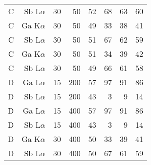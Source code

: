 \begin{table}[phtb]
\begin{center}
\begin{tabular}{rrrrrrrr}
            C               & Sb L$\alpha$  & 30             & 50             & 52                    & 68                     & 63                     & 60                     \\
            C               & Ga K$\alpha$  & 30             & 50             & 49                    & 33                     & 38                     & 41                     \\
            C               & Sb L$\alpha$  & 30             & 50             & 51                    & 67                     & 62                     & 59                     \\
            C               & Ga K$\alpha$  & 30             & 50             & 51                    & 34                     & 39                     & 42                     \\
            C               & Sb L$\alpha$  & 30             & 50             & 49                    & 66                     & 61                     & 58                     \\
            \hline
            D               & Ga L$\alpha$  & 15             & 200            & 57                    & 97                     & 91                     & 86                     \\
            D               & Sb L$\alpha$  & 15             & 200            & 43                    & 3                      & 9                      & 14                     \\
            D               & Ga L$\alpha$  & 15             & 400            & 57                    & 97                     & 91                     & 86                     \\
            D               & Sb L$\alpha$  & 15             & 400            & 43                    & 3                      & 9                      & 14                     \\
            D               & Ga K$\alpha$  & 30             & 400            & 50                    & 33                     & 39                     & 41                     \\
            D               & Sb L$\alpha$  & 30             & 400            & 50                    & 67                     & 61                     & 59                     \\
            \hline
        \end{tabular}
    \end{center}
\end{table}
\restoregeometry %
